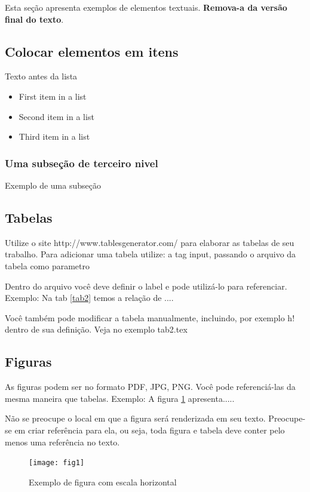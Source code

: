 \documentclass[	DIV=calc,%
							paper=a4,%
							fontsize=12pt,%
							onecolumn]{scrartcl}	 					%
\begin{document}
Esta seção apresenta exemplos de elementos textuais. \textbf{Remova-a da versão final do texto}.


\subsection{Colocar elementos em itens}

Texto antes da lista

\begin{itemize}
	\item First item in a list 
	\item Second item in a list 
	\item Third item in a list
\end{itemize}

\subsubsection{Uma subseção de terceiro nivel}

Exemplo de uma subseção

\subsection{Tabelas}

Utilize o site http://www.tablesgenerator.com/ para elaborar as tabelas de seu trabalho.
Para adicionar uma tabela utilize: a tag input, passando o arquivo da tabela como parametro



Dentro do arquivo você deve definir o label e pode utilizá-lo para referenciar. Exemplo:
Na tab \ref{tab2} temos a relação de ....


Você também pode modificar a tabela manualmente, incluindo, por exemplo h! dentro de sua definição. Veja no exemplo tab2.tex

\subsection{Figuras}

As figuras podem ser no formato PDF, JPG, PNG. Você pode referenciá-las da mesma maneira que tabelas. Exemplo: A figura \ref{fig1} apresenta.....

Não se preocupe o local em que a figura será renderizada em seu texto. Preocupe-se em criar referência para ela, ou seja, toda figura e tabela deve conter pelo menos uma referência no texto.

\begin{figure}
\centering
\texttt{[image: fig1]}
\caption{Exemplo de figura com escala horizontal}
\label{fig1}
\end{figure}
\end{document}
